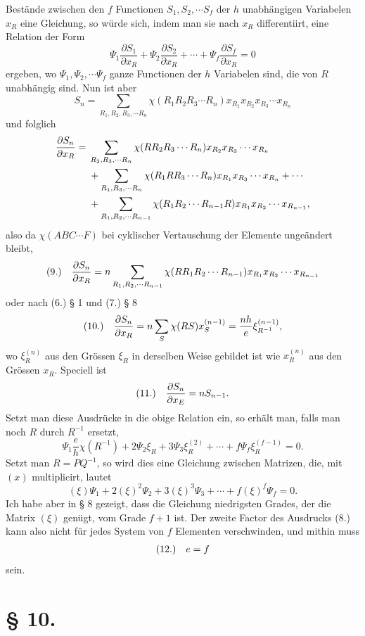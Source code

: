 \documentclass[11pt]{article}
\makeatletter
\newcommand{\frobtagc}[2]{\[\begin{array}{@{}r@{\quad}c@{}}\textup{(#1)} & \displaystyle #2\end{array}\]}
\makeatother
\begin{document}
Bestände zwischen den $f$ Functionen $S_1,S_2,\cdots S_f$ der $h$ unabhängigen Variabelen $x_R$ eine Gleichung, so würde sich, indem man sie nach $x_R$ differentiirt, eine Relation der Form
\[
\Psi_1\frac{\partial S_1}{\partial x_R}+\Psi_2\frac{\partial S_2}{\partial x_R}+\cdots+\Psi_f\frac{\partial S_f}{\partial x_R}=0
\]
ergeben, wo $\Psi_1,\Psi_2,\cdots\Psi_f$ ganze Functionen der $h$ Variabelen sind, die von $R$ unabhängig sind. Nun ist aber
\[
S_n=\sum_{R_1,R_2,R_3,\cdots R_n}\chi(R_1R_2R_3\cdots R_n)x_{R_1}x_{R_2}x_{R_3}\cdots x_{R_n}
\]
und folglich
\[
\begin{aligned}
\frac{\partial S_n}{\partial x_R}={}&\sum_{R_2,R_3,\cdots R_n}\chi(RR_2R_3\cdots R_n)x_{R_2}x_{R_3}\cdots x_{R_n}\nobreak\\
&{}+\sum_{R_1,R_3,\cdots R_n}\chi(R_1RR_3\cdots R_n)x_{R_1}x_{R_3}\cdots x_{R_n}+\cdots\nobreak\\
&{}+\sum_{R_1,R_2,\cdots R_{n-1}}\chi(R_1R_2\cdots R_{n-1}R)x_{R_1}x_{R_2}\cdots x_{R_{n-1}},
\end{aligned}
\]
also da $\chi(ABC\cdots F)$ bei cyklischer Vertauschung der Elemente ungeändert bleibt,
\frobtagc{9.}{\frac{\partial S_n}{\partial x_R}=n\sum_{R_1,R_2,\cdots R_{n-1}}\chi(RR_1R_2\cdots R_{n-1})x_{R_1}x_{R_2}\cdots x_{R_{n-1}}}
oder nach (6.) § 1 und (7.) § 8
\frobtagc{10.}{\frac{\partial S_n}{\partial x_R}=n\sum_S\chi(RS)x_S^{(n-1)}=\frac{nh}{e}\xi_{R^{-1}}^{(n-1)},}
wo $\xi_R^{(n)}$ aus den Grössen $\xi_R$ in derselben Weise gebildet ist wie $x_R^{(n)}$ aus den Grössen $x_R$. Speciell ist
\frobtagc{11.}{\frac{\partial S_n}{\partial x_E}=nS_{n-1}.}
Setzt man diese Ausdrücke in die obige Relation ein, so erhält man, falls man noch $R$ durch $R^{-1}$ ersetzt,
\[
\Psi_1\frac{e}{h}\chi(R^{-1})+2\Psi_2\xi_R+3\Psi_3\xi_R^{(2)}+\cdots+f\Psi_f\xi_R^{(f-1)}=0.
\]
Setzt man $R=PQ^{-1}$, so wird dies eine Gleichung zwischen Matrizen, die, mit $(x)$ multiplicirt, lautet
\[
(\xi)\Psi_1+2(\xi)^2\Psi_2+3(\xi)^3\Psi_3+\cdots+f(\xi)^f\Psi_f=0.
\]
Ich habe aber in § 8 gezeigt, dass die Gleichung niedrigsten Grades, der die Matrix $(\xi)$ genügt, vom Grade $f+1$ ist. Der zweite Factor des Ausdrucks (8.) kann also nicht für jedes System von $f$ Elementen verschwinden, und mithin muss
\frobtagc{12.}{e=f}
sein.

\section*{§ 10.}
\end{document}
